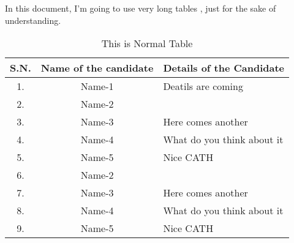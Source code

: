 \documentclass{article}
\begin{document}
	
	In this document, I'm going to use very long tables , just for the sake of understanding.
	
	\begin{table}[h]
		\begin{center}
			\begin{tabular}{|c| c| l|}
				\hline
				S.N.   & Name of the candidate & Details of the Candidate \\     \hline
				1.       & Name-1                        & Deatils are coming \\ \hline
				2.      & Name-2                        & \\  \hline
			    3.      & Name-3                        & Here comes another \\ \hline
			    4.      & Name-4                        & What do you think about it \\  \hline
			    5.      & Name-5                        & Nice CATH \\   \hline
			    6.      & Name-2                        & \\  \hline
			    7.      & Name-3                        & Here comes another \\ \hline
			    8.      & Name-4                        & What do you think about it \\  \hline
			    9.      & Name-5                        & Nice CATH \\   \hline
				
			\end{tabular}
		\caption{This is Normal Table}		
		\end{center}
	\end{table}
	
	
	
\end{document}
